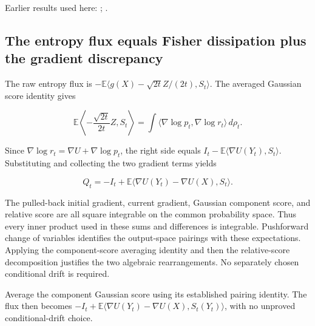 \documentclass[11pt,a4paper]{report}
\begin{document}
Earlier results used here: \cite[Section~3.26.3]{LangevinLean2026ULASC}; \cite[Section~3.36.5]{LangevinLean2026ULASC}.
\subsection{\texorpdfstring{The entropy flux equals Fisher dissipation plus the gradient discrepancy}{The entropy flux equals Fisher dissipation plus the gradient discrepancy}}
\label{report-step-UnadjustedLangevin-LSI-GaussianEntropyProduction-lean-5}


The raw entropy flux is \(-\mathbb E\langle g(X)-\sqrt{2t}Z/(2t),S_t\rangle\). The averaged Gaussian score identity gives

\[\mathbb E\left\langle-\frac{\sqrt{2t}}{2t}Z,S_t\right\rangle=\int\langle\nabla\log p_t,\nabla\log r_t\rangle\,d\rho_t.\]

Since \(\nabla\log r_t=\nabla U+\nabla\log p_t\), the right side equals \(I_t-\mathbb E\langle\nabla U(Y_t),S_t\rangle\). Substituting and collecting the two gradient terms yields

\[Q_t=-I_t+\mathbb E\langle\nabla U(Y_t)-\nabla U(X),S_t\rangle.\]

The pulled-back initial gradient, current gradient, Gaussian component score, and relative score are all square integrable on the common probability space. Thus every inner product used in these sums and differences is integrable. Pushforward change of variables identifies the output-space pairings with these expectations. Applying the component-score averaging identity and then the relative-score decomposition justifies the two algebraic rearrangements. No separately chosen conditional drift is required.



Average the component Gaussian score using its established pairing identity. The flux then becomes \(-I_t+\mathbb E\langle\nabla U(Y_t)-\nabla U(X),S_t(Y_t)\rangle\), with no unproved conditional-drift choice.
\end{document}
